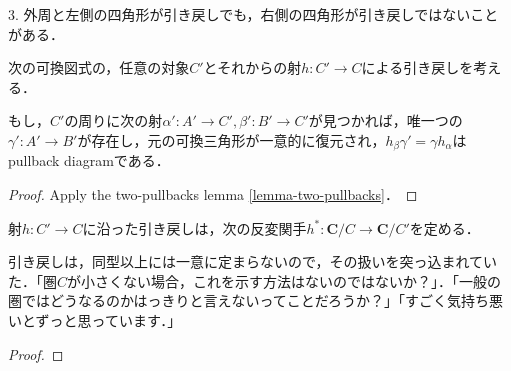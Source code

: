 \documentclass[uplatex, dvipdfmx]{jsarticle}
\begin{document}
\begin{lemma*}
    3. 外周と左側の四角形が引き戻しでも，右側の四角形が引き戻しではないことがある．
\end{lemma*}

\begin{corollary}[可換三角形の引き戻しは可換三角形である．]
    次の可換図式の，任意の対象$C'$とそれからの射$h:C'\to C$による引き戻しを考える．
    \begin{center}
    \end{center}
    もし，$C'$の周りに次の射$\alpha':A'\to C',\beta':B'\to C'$が見つかれば，唯一つの$\gamma':A'\to B'$が存在し，元の可換三角形が一意的に復元され，$h_\beta\gamma'=\gamma h_\alpha$はpullback diagramである．
    \begin{center}
    \end{center}
\end{corollary}
\begin{proof}
    Apply the two-pullbacks lemma \ref{lemma-two-pullbacks}．
\end{proof}

\begin{proposition}\label{prop-pullback-functor}
    射$h:C'\to C$に沿った引き戻しは，次の反変関手$h^*:\mathbf{C}/C\to\mathbf{C}/C'$を定める．
    \begin{center}
    \end{center}
\end{proposition}
\begin{remark*}
    引き戻しは，同型以上には一意に定まらないので，その扱いを突っ込まれていた．「圏$C$が小さくない場合，これを示す方法はないのではないか？」．「一般の圏ではどうなるのかはっきりと言えないってことだろうか？」「すごく気持ち悪いとずっと思っています．」
\end{remark*}
\begin{proof}
    
\end{proof}
\end{document}
